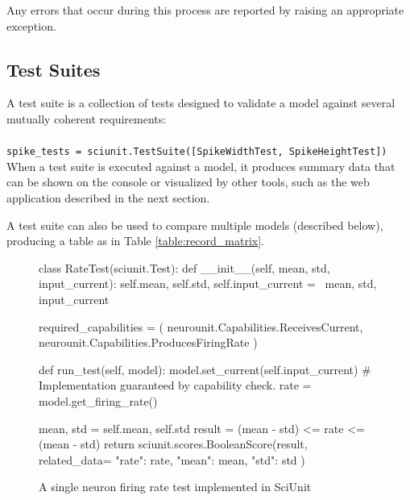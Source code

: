 \documentclass[11pt,letterpaper]{article}
\begin{document}
Any errors that occur during this process are reported by raising an appropriate exception.

\subsection{Test Suites}
A test suite is a collection of tests designed to validate a model against several mutually coherent requirements:
\\
\\
\verb|spike_tests = sciunit.TestSuite([SpikeWidthTest, SpikeHeightTest])|
\\

When a test suite is executed against a model, it produces summary data that can be shown on the console or visualized by other tools, such as the web application described in the next section.

A test suite can also be used to compare multiple models (described below), producing a table as in Table \ref{table:record_matrix}.

\begin{figure}
\caption{A single neuron firing rate test implemented in SciUnit}
\label{fig:rate_test}
\begin{python}
class RateTest(sciunit.Test):
	def __init__(self, mean, std, input_current):
		self.mean, self.std, self.input_current = \
		mean, std, input_current
	
	required_capabilities = (
		neurounit.Capabilities.ReceivesCurrent,
		neurounit.Capabilities.ProducesFiringRate
	)
	
	def run_test(self, model):
		model.set_current(self.input_current) 
		# Implementation guaranteed by capability check.  
		rate = model.get_firing_rate()
		
		mean, std = self.mean, self.std
		result = (mean - std) <= rate <= (mean - std)
		return sciunit.scores.BooleanScore(result, related_data={
			"rate": rate,
			"mean": mean,
			"std": std
		})
\end{python}
\end{figure}
\end{document}
